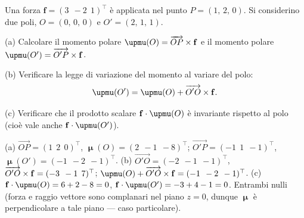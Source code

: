\begin{esercizio}
	\label{ex:A03_momento_polare}
	
	Una forza $\bm{f} = (3\;\,-2\;\,1)^\top$ è applicata nel punto $P = (1,\,2,\,0)$. Si considerino due poli, $O = (0,\,0,\,0)$ e $O' = (2,\,1,\,1)$.
	
	(a) Calcolare il momento polare $\bm{\upmu}(O) = \overrightarrow{OP} \times \fb$ e il momento polare $\bm{\upmu}(O') = \overrightarrow{O'P} \times \fb$.
	
	(b) Verificare la legge di variazione del momento al variare del polo:
	\begin{equation*}
		\bm{\upmu}(O') = \bm{\upmu}(O) + \overrightarrow{O'O} \times \fb.
	\end{equation*}
	
	(c) Verificare che il prodotto scalare $\fb \cdot \bm{\upmu}(O)$ è invariante rispetto al polo (cioè vale anche $\fb \cdot \bm{\upmu}(O')$).
	
	\risultato (a) $\overrightarrow{OP} = (1\;\,2\;\,0)^\top$, $\bm{\upmu}(O) = (2\;\,-1\;\,-8)^\top$; $\overrightarrow{O'P} = (-1\;\,1\;\,-1)^\top$, $\bm{\upmu}(O') = (-1\;\,-2\;\,-1)^\top$. (b) $\overrightarrow{O'O} = (-2\;\,-1\;\,-1)^\top$, $\overrightarrow{O'O} \times \mathbf{f} = (-3\;\,-1\;\,7)^\top$; $\bm{\upmu}(O) + \overrightarrow{O'O} \times \fb = (-1\;\,-2\;\,-1)^\top$. (c) $\fb \cdot \bm{\upmu}(O) = 6 + 2 - 8 = 0$, $\fb \cdot \bm{\upmu}(O') = -3 + 4 - 1 = 0$. Entrambi nulli (forza e raggio vettore sono complanari nel piano $z=0$, dunque $\bm{\upmu}$ è perpendicolare a tale piano --- caso particolare).
	
\end{esercizio}

